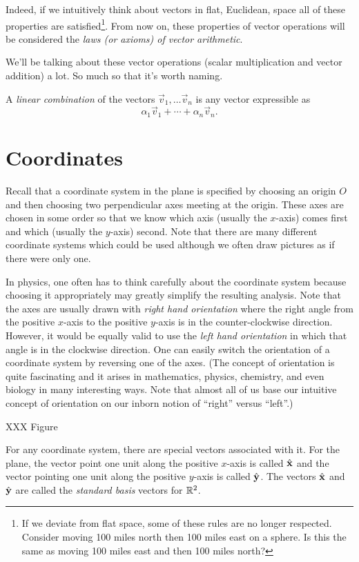 Indeed, if we intuitively think about vectors in flat, Euclidean, space
all of these properties are satisfied\footnote{
	If we deviate from flat space, some of these
	rules are no longer respected.  Consider moving 100 miles
	north then 100 miles east on a sphere.  Is this the
	same as moving 100 miles east and then 100 miles north?
}.  From now on, these properties of vector operations will be considered
the 
\emph{laws (or axioms) of vector arithmetic}.

We'll be talking about these vector operations (scalar multiplication and
vector addition) a lot.  So much so that it's worth naming.
\begin{definition}
	A \emph{linear combination} of the vectors $\vec v_1,\ldots \vec v_n$
	is any vector expressible as
	\[
		\alpha_1\vec v_1+\cdots +\alpha_n\vec v_n.
	\]
\end{definition}

\section{Coordinates}
Recall that a coordinate system in the plane is specified by choosing
an origin $O$ and then choosing two perpendicular axes meeting at
the origin.  These axes are chosen in some order so that we know which
axis (usually the $x$-axis) comes first and which (usually the
$y$-axis) second.   Note that there are many different coordinate systems
which could be used although we often draw pictures
as if there were only one.

In physics, one often has to think carefully about the
coordinate system because
choosing it appropriately  may greatly simplify the
resulting analysis.  Note that the axes are usually drawn with 
\emph{right hand orientation} where the right angle from the positive
$x$-axis to the positive $y$-axis is in the counter-clockwise
direction.  However, it would be equally valid to use the
\emph{left hand orientation} in which that angle is in the
clockwise direction.  One can easily switch the orientation of
a coordinate system by reversing one of the axes.   (The concept of
orientation is quite fascinating and it arises in mathematics,
physics, chemistry, and even biology in many interesting ways.
Note that almost all of us base our intuitive concept of orientation
on our inborn notion of ``right'' versus ``left''.)

XXX Figure

For any coordinate system, there are special vectors
associated with it.  For the plane, the vector point one unit along
the positive $x$-axis is called ${\hat {\mathbf x}}$ and the vector pointing one unit along
the positive $y$-axis is called ${\hat {\mathbf y}}$.  The vectors ${\hat {\mathbf x}}$ and ${\hat {\mathbf y}}$ are
called the \emph{standard basis} vectors for $\mathbb{R}^2$.

